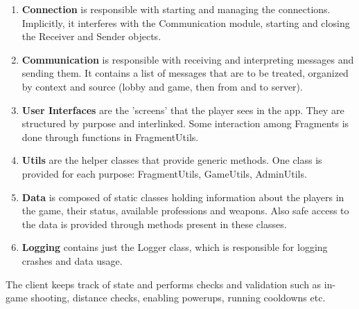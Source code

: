 \begin{enumerate}
  \item \textbf{Connection} is responsible with starting and managing the
  connections. Implicitly, it interferes with the Communication module, starting
  and closing the Receiver and Sender objects.
  
  \item \textbf{Communication} is responsible with receiving and interpreting
  messages and sending them. It contains a list of messages that are to be
  treated, organized by context and source (lobby and game, then from and to
  server).
  
  \item \textbf{User Interfaces} are the 'screens' that the player sees in the
  app. They are structured by purpose and interlinked. Some interaction among
  Fragments is done through functions in FragmentUtils.
  
  \item \textbf{Utils} are the helper classes that provide generic methods.
  One class is provided for each purpose: FragmentUtils, GameUtils, AdminUtils.
  
  \item \textbf{Data} is composed of static classes holding information about
  the players in the game, their status, available professions and weapons. Also
  safe access to the data is provided through methods present in these classes.
  
  \item \textbf{Logging} contains just the Logger class, which is responsible
  for logging crashes and data usage.
\end{enumerate}

The client keeps track of state and performs checks and validation such as
in-game shooting, distance checks, enabling powerups, running cooldowns
etc.\newline

